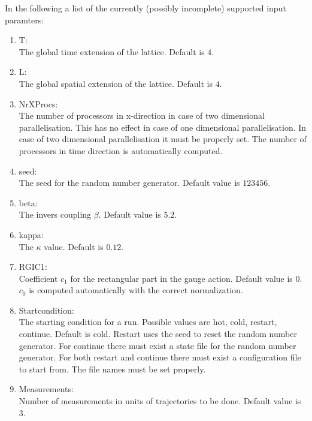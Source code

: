In the following a list of the currently (possibly incomplete)
supported input paramters: 
\begin{enumerate}
\item {\ttfamily T}:\\
  The global time extension of the lattice. Default is $4$.

\item {\ttfamily L}:\\
  The global spatial extension of the lattice. Default is $4$.

\item {\ttfamily NrXProcs}:\\
  The number of processors in x-direction in case of two dimensional
  parallelisation. This has no effect in case of one dimensional
  parallelisation. In case of two dimensional parallelisation it must
  be properly set. The number of processors in time direction is
  automatically computed.

\item {\ttfamily seed}:\\
  The seed for the random number generator. Default value is $123456$.

\item {\ttfamily beta}:\\
  The invers coupling $\beta$. Default value is $5.2$.

\item {\ttfamily kappa}:\\
  The $\kappa$ value. Default is $0.12$.

\item {\ttfamily RGIC1}:\\
  Coefficient $c_1$ for the rectangular part in the gauge
  action. Default value is $0$. $c_0$ is computed automatically with
  the correct normalization.

\item {\ttfamily Startcondition}:\\
  The starting condition for a run. Possible values are {\ttfamily
    hot, cold, restart, continue}. Default is {\ttfamily
    cold}. Restart uses the seed to reset the random number
  generator. For continue there must exist a state file for the random
  number generator. For both restart and continue there must exist a
  configuration file to start from. The file names must be set properly.

\item {\ttfamily Measurements}:\\
  Number of measurements in units of trajectories to be done. Default
  value is $3$. 


\end{enumerate}
